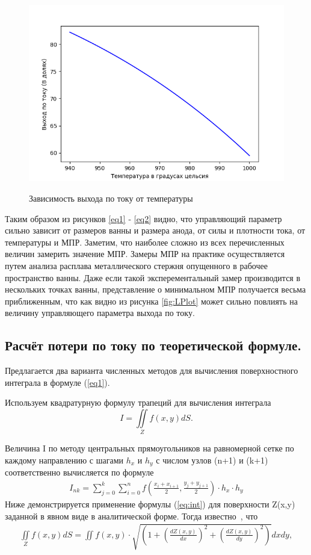 \documentclass{article}
\begin{document}
\begin{figure}[H]
\centering
\includegraphics[width=0.8\linewidth]{T.png}
\caption{}
\label{fig:TPlot}
Зависимость выхода по току от температуры
\end{figure}

Таким образом из рисунков \ref{eq1} - \ref{eq2} видно, что управляющий параметр сильно зависит от размеров ванны и размера анода, от силы и плотности тока, от температуры и МПР. Заметим, что наиболее сложно из всех перечисленных величин замерить значение МПР. Замеры МПР на практике осуществляется путем анализа расплава металлического стержня опущенного в рабочее пространство ванны. Даже если такой эксперементальный замер производится в нескольких точках ванны, представление о минимальном МПР получается весьма приближенным, что как видно из рисунка \ref{fig:LPlot} может сильно повлиять на величину управляющего параметра выхода по току.

\subsection{Расчёт потери по току по теоретической формуле.}\label{sec:teor}

Предлагается два варианта численных методов для вычисления поверхностного интеграла в формуле (\ref{eq1}).

Используем квадратурную формулу трапеций для вычисления интеграла
\begin{equation} \label{eq:int}
I = \iint\limits_Z f(x,y) dS.
\end{equation}

Величина I по методу центральных прямоугольников на равномерной сетке по каждому направлению с шагами $h_x$ и $h_y$ с числом узлов (n+1) и (k+1) соответственно вычисляется по формуле
\begin{align}\label{eq:squaremethod}
I_{nk} = \sum\limits_{j=0}^{k} \sum\limits_{i=0}^{n} f(\frac{x_i+x_{i+1}}{2},\frac{y_j+y_{j+1}}{2}) \cdot h_x \cdot h_y
\end{align}
Ниже демонстрируется применение формулы (\ref{eq:int}) для поверхности Z(x,y) заданной в явном виде в аналитической форме. Тогда известно~\cite{ litlink:Kudryavcev}, что %
\begin{align}
\iint\limits_Z f(x,y) dS = \label{eq:analit}
\iint\limits f(x,y) \cdot \sqrt{(1+(\frac{dZ(x,y)}{dx})^2+ (\frac{dZ(x,y)}{dy})^2)}dxdy,
\end{align}
\end{document}
